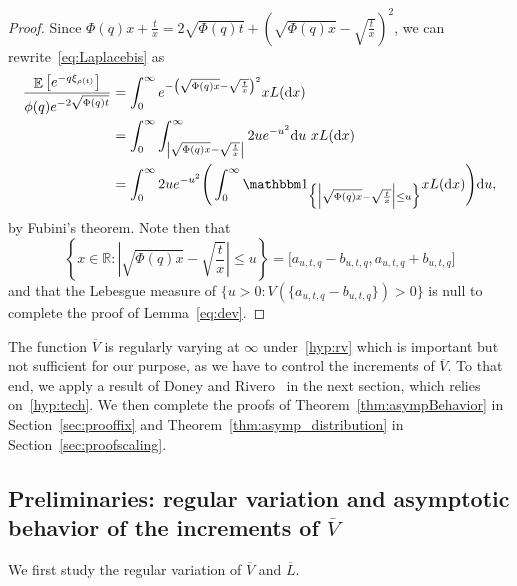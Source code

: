 \documentclass[10pt]{amsart}
\theoremstyle{definition}
\numberwithin{equation}{section}
\newcommand{\R}{\mathbb{R}}
\DeclareMathOperator{\E}{\mathbb{E}}
\newcommand{\dd}{\mathrm{d}}
\renewcommand{\bar}[1]{\overline{#1}}
\begin{document}
\begin{proof}
Since $\Phi(q)x + \frac{t}{x} = 2 \sqrt{\Phi(q)t} + (\sqrt{\Phi(q)x}-\sqrt{\frac{t}{x}})^2$, we can rewrite~\eqref{eq:Laplacebis} as
\begin{align*}
\frac{\E\left[e^{-q\xi_{\rho(t)}}\right]}{\phi(q) e^{-2 \sqrt{\Phi(q)t}}} &= \int_0^\infty e^{-\left(\sqrt{\Phi(q)x}-\sqrt{\frac{t}{x}}\right)^2} x L(\dd x)\\
&= \int_0^{\infty} \int_{\left|\sqrt{\Phi(q)x}-\sqrt{\frac{t}{x}}\right|}^{\infty}2ue^{-u^2} \dd u \ xL(\dd x)\\
&= \int_0^{\infty} 2ue^{-u^2} \Bigg(\int_0^{\infty} \mathbbm 1_{\Big\{\Big|\sqrt{\Phi(q)x}-\sqrt{\frac{t}{x}}\Big| \leq u\Big\}} xL(\dd x)\Bigg) \dd u,
\end{align*}
by Fubini's theorem. Note then that
\[
\left\{x \in \R : \left|\sqrt{\Phi(q)x}-\sqrt{\frac{t}{x}}\right| \leq u\right\} = \big[a_{u,t,q}-b_{u,t,q},a_{u,t,q}+b_{u,t,q}\big]
\]
and that the Lebesgue measure of $\{u>0:V(\{a_{u,t,q}-b_{u,t,q}\})>0\}$ is null to complete the proof of Lemma~\ref{eq:dev}.
\end{proof}



The function $\bar V$ is regularly varying at $\infty$ under~\eqref{hyp:rv} which is important but not sufficient for our purpose, as we have to control the increments of $\bar V$. To that end, we apply a result of Doney and Rivero~\cite{DR13} in the next section, which relies on~\eqref{hyp:tech}. We then complete the proofs of Theorem~\ref{thm:asympBehavior} in Section~\ref{sec:prooffix} and Theorem~\ref{thm:asymp_distribution} in Section~\ref{sec:proofscaling}.


\subsection{Preliminaries: regular variation and asymptotic behavior of the increments of \texorpdfstring{$\bar V$}{V}}\label{sec:incrementsofV}

We first study the regular variation of $\bar V$ and $\bar{L}$.
\end{document}
